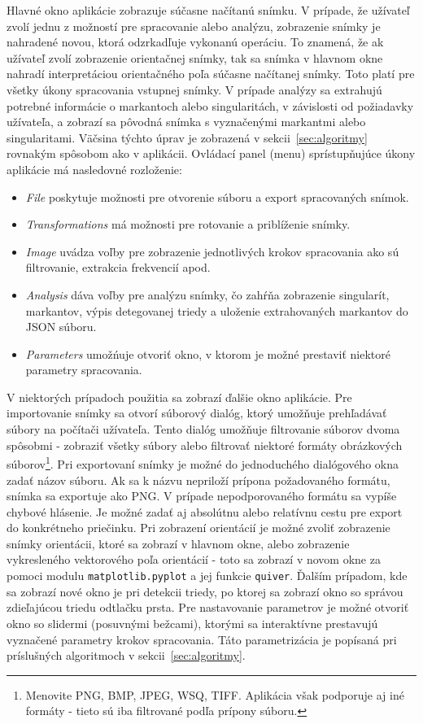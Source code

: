   Hlavné okno aplikácie zobrazuje súčasne načítanú snímku. V prípade, že užívateľ zvolí jednu z možností pre spracovanie alebo analýzu, zobrazenie snímky je
  nahradené novou, ktorá odzrkadľuje vykonanú operáciu. To znamená, že ak užívateľ zvolí zobrazenie orientačnej snímky, tak sa snímka v hlavnom okne nahradí
  interpretáciou orientačného poľa súčasne načítanej snímky. Toto platí pre všetky úkony spracovania vstupnej snímky. V prípade analýzy sa extrahujú potrebné
  informácie o markantoch alebo singularitách, v závislosti od požiadavky užívateľa, a zobrazí sa pôvodná snímka s vyznačenými markantmi alebo singularitami.
  Väčsina týchto úprav je zobrazená v sekcii~{\ref{sec:algoritmy}} rovnakým spôsobom ako v aplikácii. Ovládací panel (menu) sprístupňujúce úkony aplikácie má
  nasledovné rozloženie:
  \begin{itemize}
    \item \emph{File} poskytuje možnosti pre otvorenie súboru a export spracovaných snímok.
    \item \emph{Transformations} má možnosti pre rotovanie a priblíženie snímky.
    \item \emph{Image} uvádza voľby pre zobrazenie jednotlivých krokov spracovania ako sú filtrovanie, extrakcia frekvencií apod.
    \item \emph{Analysis} dáva voľby pre analýzu snímky, čo zahŕňa zobrazenie singularít, markantov, výpis detegovanej triedy a uloženie extrahovaných
          markantov do JSON súboru.
    \item \emph{Parameters} umožńuje otvoriť okno, v ktorom je možné prestaviť niektoré parametry spracovania.
  \end{itemize}

  V niektorých prípadoch použitia sa zobrazí ďalšie okno aplikácie. Pre importovanie snímky sa otvorí súborový dialóg, ktorý umožňuje prehľadávať súbory
  na počítači užívateľa. Tento dialóg umožňuje filtrovanie súborov dvoma spôsobmi - zobraziť všetky súbory alebo filtrovať niektoré formáty obrázkových
  súborov\footnote{Menovite PNG, BMP, JPEG, WSQ, TIFF. Aplikácia však podporuje aj iné formáty - tieto sú iba filtrované podľa prípony súboru.}.
  Pri exportovaní snímky je možné do jednoduchého dialógového okna zadať názov súboru. Ak sa k názvu nepriloží prípona požadovaného formátu, snímka sa
  exportuje ako PNG. V prípade nepodporovaného formátu sa vypíše chybové hlásenie. Je možné zadať aj absolútnu alebo relatívnu cestu pre export do konkrétneho
  priečinku. Pri zobrazení orientácií je možné zvoliť zobrazenie snímky orientácii, ktoré sa zobrazí v hlavnom okne, alebo zobrazenie vykresleného vektorového
  poľa orientácií - toto sa zobrazí v novom okne za pomoci modulu \texttt{matplotlib.pyplot} a jej funkcie \texttt{quiver}. Ďalším prípadom, kde sa zobrazí nové
  okno je pri detekcii triedy, po ktorej sa zobrazí okno so správou zdieľajúcou triedu odtlačku prsta. Pre nastavovanie parametrov je možné otvoriť okno
  so slidermi (posuvnými bežcami), ktorými sa interaktívne prestavujú vyznačené parametry krokov spracovania. Táto parametrizácia je popísaná pri príslušných
  algoritmoch v sekcii~{\ref{sec:algoritmy}}.

